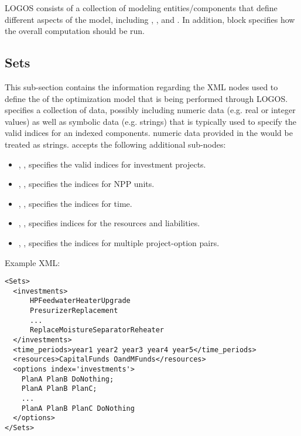 LOGOS consists of a collection of modeling entities/components that define different
aspects of the model, including , ,
 and . In addition, 
block specifies how the overall computation should be run.

%
\subsection{Sets}
\label{subsec:Sets}

This sub-section contains the information regarding the XML nodes used to define the
 of the optimization model that is being performed through LOGOS.
 specifies a collection of data, possibly including
numeric data (e.g. real or integer values) as well as symbolic data (e.g. strings)
that is typically used to specify the valid indices for an indexed components.
\nb numeric data provided in the  would be treated as strings.
 accepts the following additional sub-nodes:
\begin{itemize}
  \item {}, , specifies
  the valid indices for investment projects.
  \item {}, ,
  specifies the indices for NPP units.
  \item {}, ,
  specifies the indices for time.
  \item {}, ,
  specifies indices for the resources and liabilities.
  \item {}, ,
  specifies the indices for multiple project-option pairs.
\end{itemize}

Example XML:
\begin{lstlisting}[style=XML]
<Sets>
  <investments>
      HPFeedwaterHeaterUpgrade
      PresurizerReplacement
      ...
      ReplaceMoistureSeparatorReheater
  </investments>
  <time_periods>year1 year2 year3 year4 year5</time_periods>
  <resources>CapitalFunds OandMFunds</resources>
  <options index='investments'>
    PlanA PlanB DoNothing;
    PlanA PlanB PlanC;
    ...
    PlanA PlanB PlanC DoNothing
  </options>
</Sets>
\end{lstlisting}


